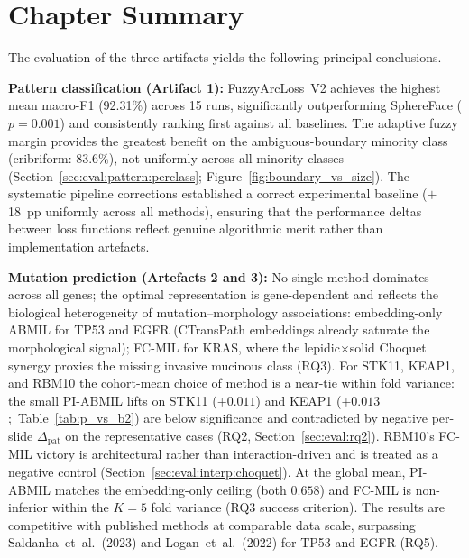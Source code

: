 \section{Chapter Summary}
\label{sec:eval:summary}

The evaluation of the three artifacts yields the following principal
conclusions.

\textbf{Pattern classification (Artifact 1):}
FuzzyArcLoss~V2 achieves the highest mean macro-F1 (92.31\%) across 15 runs,
significantly outperforming SphereFace ($p = 0.001$) and consistently
ranking first against all baselines.
The adaptive fuzzy margin provides the greatest benefit on the
ambiguous-boundary minority class (cribriform: 83.6\%), not
uniformly across all minority classes
(Section~\ref{sec:eval:pattern:perclass};
Figure~\ref{fig:boundary_vs_size}).
The systematic pipeline corrections established a correct experimental
baseline ($+$18~pp uniformly across all methods), ensuring that the
performance deltas between loss functions reflect genuine algorithmic
merit rather than implementation artefacts.

\textbf{Mutation prediction (Artefacts 2 and 3):}
No single method dominates across all genes; the optimal
representation is gene-dependent and reflects the biological
heterogeneity of mutation--morphology associations:
embedding-only ABMIL for TP53 and EGFR (CTransPath embeddings
already saturate the morphological signal);
FC-MIL for KRAS, where the lepidic$\times$solid Choquet synergy
proxies the missing invasive mucinous class (RQ3).
For STK11, KEAP1, and RBM10 the cohort-mean choice of method is a
near-tie within fold variance: the small PI-ABMIL lifts on STK11
($+0.011$) and KEAP1 ($+0.013$;~Table~\ref{tab:p_vs_b2}) are
below significance and contradicted by negative per-slide
$\Delta_{\mathrm{pat}}$ on the representative cases
(RQ2, Section~\ref{sec:eval:rq2}).
RBM10's FC-MIL victory is architectural rather than
interaction-driven and is treated as a negative control
(Section~\ref{sec:eval:interp:choquet}).
At the global mean, PI-ABMIL matches the embedding-only ceiling
(both $0.658$) and FC-MIL is non-inferior within the $K=5$ fold
variance (RQ3 success criterion).
The results are competitive with published methods at comparable
data scale, surpassing Saldanha~et~al.\ (2023) and
Logan~et~al.\ (2022) for TP53 and EGFR (RQ5).

